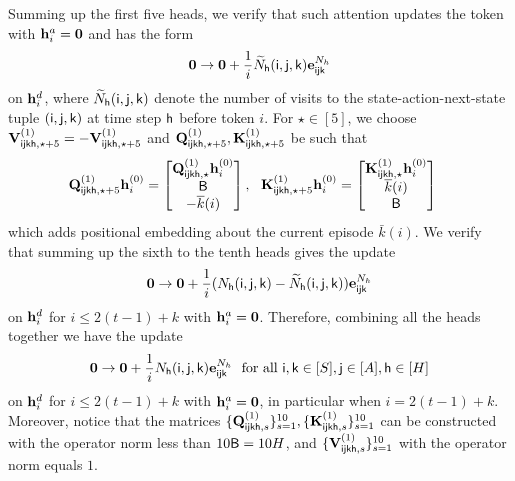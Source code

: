 Summing up the first five heads, we verify that such attention updates the token with ${\mathbf h}_i^{a}={\mathbf 0}$ and has the form
\begin{align*}
{\mathbf 0}\rightarrow{\mathbf 0}+\frac1i\widetilde{{N}}_{\mathsf{h}}({\mathsf{i}},{\mathsf{j}},{\mathsf{k}}){\mathbf e}_{{\mathsf{i}}{\mathsf{j}}{\mathsf{k}}}^{{N}_h}
\end{align*} on  ${\mathbf h}^{d}_i$, where $\widetilde{{N}}_{\mathsf{h}}({\mathsf{i}},{\mathsf{j}},{\mathsf{k}})$ denote the number of visits to the state-action-next-state tuple $({\mathsf{i}},{\mathsf{j}},{\mathsf{k}})$ at time step ${\mathsf{h}}$ before token $i$. For $\star\in[5]$, we choose ${\mathbf V}^{(1)}_{{\mathsf{i}}{\mathsf{j}}{\mathsf{k}}{\mathsf{h}},\star+5}=-{\mathbf V}^{(1)}_{{\mathsf{i}}{\mathsf{j}}{\mathsf{k}}{\mathsf{h}},\star+5}$ and ${\mathbf Q}^{(1)}_{{\mathsf{i}}{\mathsf{j}}{\mathsf{k}}{\mathsf{h}},\star+5},{\mathbf K}^{(1)}_{{\mathsf{i}}{\mathsf{j}}{\mathsf{k}}{\mathsf{h}},\star+5}$ be such that
\begin{align*}
&{\mathbf Q}^{(1)}_{{\mathsf{i}}{\mathsf{j}}{\mathsf{k}}{\mathsf{h}},\star+5}{\mathbf h}^{(0)}_{i}=
\begin{bmatrix}
{\mathbf Q}^{(1)}_{{\mathsf{i}}{\mathsf{j}}{\mathsf{k}}{\mathsf{h}},\star}{\mathbf h}^{(0)}_{i}\\
{\mathsf{B}}\\
-\overline{k}(i)
    \end{bmatrix},~~ {\mathbf K}^{(1)}_{{\mathsf{i}}{\mathsf{j}}{\mathsf{k}}{\mathsf{h}},\star+5}{\mathbf h}^{(0)}_{i}=\begin{bmatrix}
{\mathbf K}^{(1)}_{{\mathsf{i}}{\mathsf{j}}{\mathsf{k}}{\mathsf{h}},\star}{\mathbf h}^{(0)}_{i}\\ \overline{k}(i)\\{\mathsf{B}}
\end{bmatrix}
\end{align*} which adds positional embedding about the current episode $\bar{k}(i)$. We verify that summing up the sixth to the tenth heads gives the update  \begin{align*}
{\mathbf 0}\rightarrow{\mathbf 0}+\frac{1}{i}({{N}}_{\mathsf{h}}({\mathsf{i}},{\mathsf{j}},{\mathsf{k}})-\widetilde{{N}}_{\mathsf{h}}({\mathsf{i}},{\mathsf{j}},{\mathsf{k}})){\mathbf e}_{{\mathsf{i}}{\mathsf{j}}{\mathsf{k}}}^{{N}_h}
\end{align*} on  ${\mathbf h}^{d}_i$ for $i\leq 2(t-1)+k$ with ${\mathbf h}_i^{a}={\mathbf 0}$. Therefore, combining all the heads together we have the update
\begin{align*}
{\mathbf 0}\rightarrow{\mathbf 0}+\frac{1}{i}{{N}}_{\mathsf{h}}({\mathsf{i}},{\mathsf{j}},{\mathsf{k}}){\mathbf e}_{{\mathsf{i}}{\mathsf{j}}{\mathsf{k}}}^{{N}_h}\text{~~for all~}{\mathsf{i}},{\mathsf{k}}\in[{S}],{\mathsf{j}}\in[{A}],{\mathsf{h}}\in[{H}]
\end{align*} on ${\mathbf h}^{d}_i$ for $i\leq 2(t-1)+k$ with ${\mathbf h}_i^{a}={\mathbf 0}$, in particular when $i=2(t-1)+k$. Moreover,  notice that the matrices $\{{\mathbf Q}^{(1)}_{{\mathsf{i}}{\mathsf{j}}{\mathsf{k}}{\mathsf{h}},s}\}_{s=1}^{10},\{{\mathbf K}^{(1)}_{{\mathsf{i}}{\mathsf{j}}{\mathsf{k}}{\mathsf{h}},s}\}_{s=1}^{10}$ can be constructed with the operator norm less than $10{\mathsf{B}}=10{H}$, and $\{{\mathbf V}^{(1)}_{{\mathsf{i}}{\mathsf{j}}{\mathsf{k}}{\mathsf{h}},s}\}_{s=1}^{10}$ with the operator norm equals $1$.

